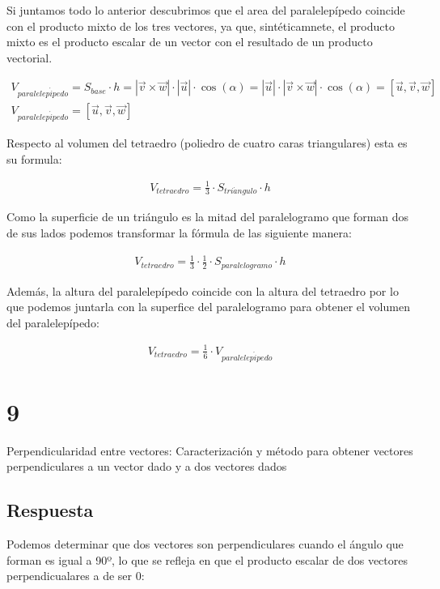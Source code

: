 \documentclass[
	12pt, %
	spanish, %
]{fphw}
\newcommand{\vu}{\vec{u}}
\newcommand{\vv}{\vec{v}}
\newcommand{\vw}{\vec{w}}
\begin{document}
Si juntamos todo lo anterior descubrimos que el area del paralelepípedo coincide con el producto mixto de los tres vectores, ya que, sintéticamnete, el producto mixto es el producto escalar de un vector con el resultado de un producto vectorial.

\begin{gather*}
	V_{paralelep\acute{i}pedo} = S_{base} \cdot h = |\vv \times \vw| \cdot |\vu| \cdot \cos(\alpha) = |\vu| \cdot|\vv \times \vw| \cdot \cos(\alpha)=[\vu,\vv,\vw]\\
	V_{paralelep\acute{i}pedo} = [\vu,\vv,\vw]
\end{gather*}


Respecto al volumen del tetraedro (poliedro de cuatro caras triangulares) esta es su formula:

\begin{gather*}
	V_{tetraedro} = \frac{1}{3} \cdot S_{tri\acute{a}ngulo} \cdot h
\end{gather*}

Como la superficie de un triángulo es la mitad del paralelogramo que forman dos de sus lados podemos transformar la fórmula de las siguiente manera: 

\begin{gather*}
	V_{tetraedro} = \frac{1}{3} \cdot \frac{1}{2} \cdot S_{paralelogramo} \cdot h
\end{gather*}

Además, la altura del paralelepípedo coincide con la altura del tetraedro por lo que podemos juntarla con la superfice del paralelogramo para obtener el  volumen del paralelepípedo:

\begin{gather*}
	V_{tetraedro} = \frac{1}{6} \cdot V_{paralelep\acute{i}pedo} 
\end{gather*}


\section*{9}

\begin{problem}
	Perpendicularidad entre vectores: Caracterización y método para obtener
vectores perpendiculares a un vector dado y a dos vectores dados
\end{problem}

\subsection*{Respuesta} Podemos determinar que dos vectores son perpendiculares cuando el ángulo que forman es igual a 90º, lo que se refleja en que el producto escalar de dos vectores perpendicualares a de ser 0:
\end{document}
